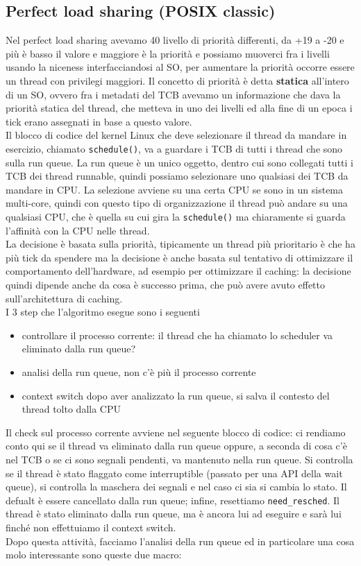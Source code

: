 \documentclass[12pt, oneside]{extbook}
\begin{document}
\subsection{Perfect load sharing (POSIX classic)}
Nel perfect load sharing avevamo 40 livello di priorità differenti, da +19 a -20 e più è basso il valore e maggiore è la priorità e possiamo muoverci fra i livelli usando la niceness interfacciandosi al SO, per aumentare la priorità occorre essere un thread con privilegi maggiori. Il concetto di priorità è detta \textbf{statica} all'intero di un SO, ovvero fra i metadati del TCB avevamo un informazione che dava la priorità statica del thread, che metteva in uno dei livelli ed alla fine di un epoca i tick erano assegnati in base a questo valore.\\Il blocco di codice del kernel Linux che deve selezionare il thread da mandare in esercizio, chiamato \texttt{schedule()}, va a  guardare i TCB di tutti i thread che sono sulla run queue. La run queue è un unico oggetto, dentro cui sono collegati tutti i TCB dei thread runnable, quindi possiamo selezionare uno qualsiasi dei TCB da mandare in CPU. La selezione avviene su una certa CPU se sono in un sistema multi-core, quindi con questo tipo di organizzazione il thread può andare su una qualsiasi CPU, che è quella su cui gira la \texttt{schedule()} ma chiaramente si guarda l'affinità con la CPU nelle thread.\\La decisione è basata sulla priorità, tipicamente un thread più prioritario è che ha più tick da spendere ma la decisione è anche basata sul tentativo di ottimizzare il comportamento dell'hardware, ad esempio per ottimizzare il caching: la decisione quindi dipende anche da cosa è successo prima, che può avere avuto effetto sull'architettura di caching.\\I 3 step che l'algoritmo esegue sono i seguenti
\begin{itemize}
\item controllare il processo corrente: il thread che ha chiamato lo scheduler va eliminato dalla run queue?
\item analisi della run queue, non c'è più il processo corrente
\item context switch dopo aver analizzato la run queue, si salva il contesto del thread tolto dalla CPU
\end{itemize}
Il check sul processo corrente avviene nel seguente blocco di codice:
ci rendiamo conto qui se il thread va eliminato dalla run queue oppure, a seconda di cosa c'è nel TCB o se ci sono segnali pendenti, va mantenuto nella run queue. Si controlla se il thread è stato flaggato come interruptible (passato per una API della wait queue), si controlla la maschera dei segnali e nel caso ci sia si cambia lo stato. Il defualt è essere cancellato dalla run queue; infine, resettiamo \texttt{need\_resched}. Il thread è stato eliminato dalla run queue, ma è ancora lui ad eseguire e sarà lui finché non effettuiamo il context switch.\\Dopo questa attività, facciamo l'analisi della run queue ed in particolare una cosa molo interessante sono queste due macro:
\end{document}

